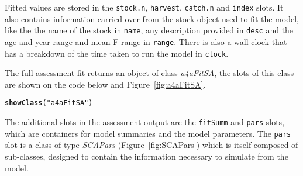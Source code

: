 \documentclass[a4paper,english,10pt]{article}\usepackage[]{graphicx}\usepackage[]{color}
\makeatletter
\newcommand{\hlstr}[1]{\textcolor[rgb]{0.192,0.494,0.8}{#1}}%
\newcommand{\hlstd}[1]{\textcolor[rgb]{0.345,0.345,0.345}{#1}}%
\newcommand{\hlkwd}[1]{\textcolor[rgb]{0.737,0.353,0.396}{\textbf{#1}}}%
\newenvironment{kframe}{%
 \def\at@end@of@kframe{}%
 \ifinner\ifhmode%
  \def\at@end@of@kframe{\end{minipage}}%
  \begin{minipage}{\columnwidth}%
 \fi\fi%
 \def\FrameCommand##1{\hskip\@totalleftmargin \hskip-\fboxsep
 \colorbox{shadecolor}{##1}\hskip-\fboxsep
     \hskip-\linewidth \hskip-\@totalleftmargin \hskip\columnwidth}%
 \MakeFramed {\advance\hsize-\width
   \@totalleftmargin\z@ \linewidth\hsize
   \@setminipage}}%
 {\par\unskip\endMakeFramed%
 \at@end@of@kframe}
\newenvironment{knitrout}{}{} %
\newcommand{\code}[1]{{\texttt{#1}}}
\newcommand{\class}[1]{{\textit{#1}}}
\makeatother
\begin{document}
\begin{knitrout}
\color{fgcolor}\begin{kframe}


{\ttfamily\noindent\bfseries{}}\end{kframe}
\end{knitrout}

Fitted values are stored in the \code{stock.n}, \code{harvest}, \code{catch.n} and \code{index} slots. It also contains information carried over from the stock object used to fit the model, like the the name of the stock in \code{name}, any description provided in \code{desc} and the age and year range and mean F range in \code{range}. There is also a wall clock that has a breakdown of the time taken to run the model in \code{clock}.

The full assessment fit returns an object of class \class{a4aFitSA}, the slots of this class are shown on the code below and Figure~\ref{fig:a4aFitSA}.

\begin{knitrout}
\color{fgcolor}\begin{kframe}
\begin{alltt}
\hlkwd{showClass}\hlstd{(}\hlstr{"a4aFitSA"}\hlstd{)}
\end{alltt}


{\ttfamily\noindent\bfseries{}}\end{kframe}
\end{knitrout}

\begin{knitrout}
\color{fgcolor}\begin{kframe}


{\ttfamily\noindent\bfseries{}}\end{kframe}
\end{knitrout}

The additional slots in the assessment output are the \code{fitSumm} and \code{pars} slots, which are containers for model summaries and the model parameters. The \code{pars} slot is a class of type \class{SCAPars} (Figure~\ref{fig:SCAPars}) which is itself composed of sub-classes, designed to contain the information necessary to simulate from the model.
\end{document}
